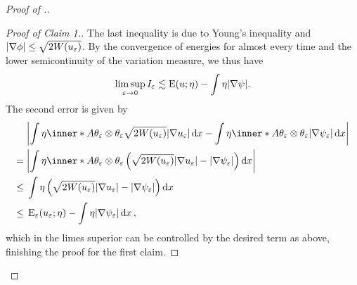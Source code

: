 \begin{proof}[Proof of .]
\begin{proof}[Proof of Claim 1.]
		The last inequality is due to Young's inequality and $ \abs{ \nabla 
			\phi } \leq \sqrt{ 2 W ( u_{ \varepsilon } ) } $.
		By the convergence of energies for almost every time and the lower 
		semicontinuity of the variation measure, we thus have
		\begin{equation*}
			\limsup_{ \varepsilon \to 0 }
			I_{ \varepsilon }
			\lesssim
			\operatorname{E} ( u ; \eta )
			-
			\int
			\eta
			\abs{ \nabla \psi }.
		\end{equation*}
		The second error is given by
		\begin{align*}
			& \abs{
				\int
				\eta
				\inner*{ A }{ \theta_{ \varepsilon } \otimes \theta_{ 
				\varepsilon 
				} }
				\sqrt{ 2 W ( u_{ \varepsilon } ) }
				\abs{ \nabla u_{ \varepsilon } }
				\dd{ x }
				-
				\int
				\eta
				\inner*{ A }{ \theta_{ \varepsilon } \otimes \theta_{ 
				\varepsilon 
				} }
				\abs{ \nabla \psi_{ \varepsilon } }
				\dd{ x }
			}
			\\
			={} &
			\abs{
				\int
				\eta
				\inner*{ A }{ \theta_{ \varepsilon } \otimes \theta_{ 
				\varepsilon 
				} }
				\left(
				\sqrt{ 2 W ( u_{ \varepsilon } ) } \abs{ \nabla u_{ 
						\varepsilon } } 
				-
				\abs{ \nabla \psi_{ \varepsilon } }
				\right)
				\dd{ x }
			}
			\\
			\leq {} &
			\int
			\eta
			\left(
			\sqrt{ 2 W ( u_{ \varepsilon } ) }
			\abs{ \nabla u_{ \varepsilon } }
			-
			\abs{ \nabla \psi_{ \varepsilon } }
			\right)
			\dd{ x }
			\\
			\leq{} &
			\energy_{ \varepsilon } ( u_{ \varepsilon } ; \eta )
			-
			\int
			\eta 
			\abs{ \nabla \psi_{ \varepsilon } }
			\dd{ x },
		\end{align*}
		which in the limes superior can be controlled by the desired term as 
		above, finishing the proof for the first claim.
	\end{proof}
	

\end{proof}
